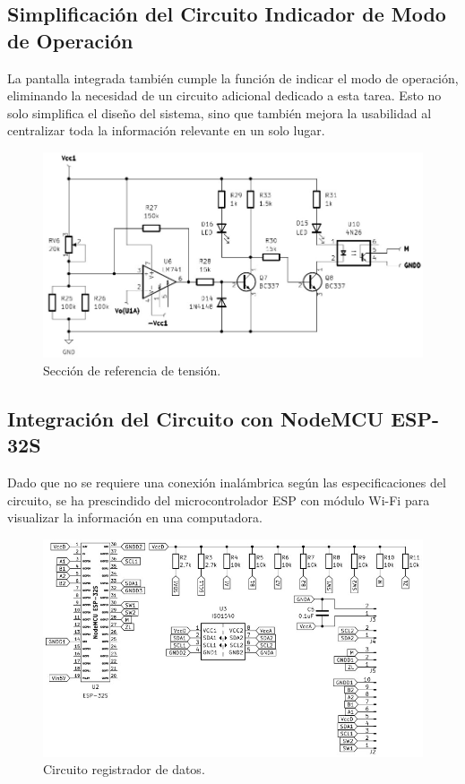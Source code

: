 \subsection{Simplificación del Circuito Indicador de Modo de Operación}
La pantalla integrada también cumple la función de indicar el modo de operación, eliminando la necesidad de un circuito adicional dedicado a esta tarea. Esto no solo simplifica el diseño del sistema, sino que también mejora la usabilidad al centralizar toda la información relevante en un solo lugar.
\begin{figure}[H]
    \centering
    \includegraphics[scale=0.5]{./imagenes/modo_operacion.jpg}
    \caption{Sección de referencia de tensión.}
    \label{F:modo_operacion}
\end{figure}

\subsection{Integración del Circuito con NodeMCU ESP-32S}
Dado que no se requiere una conexión inalámbrica según las especificaciones del circuito, se ha prescindido del microcontrolador ESP con módulo Wi-Fi para visualizar la información en una computadora.
\begin{figure}[H]
    \centering
    \includegraphics[scale=0.5]{./imagenes/ESP_32S.jpg}
    \caption{Circuito registrador de datos.}
    \label{F:ESP_32S}
\end{figure}

